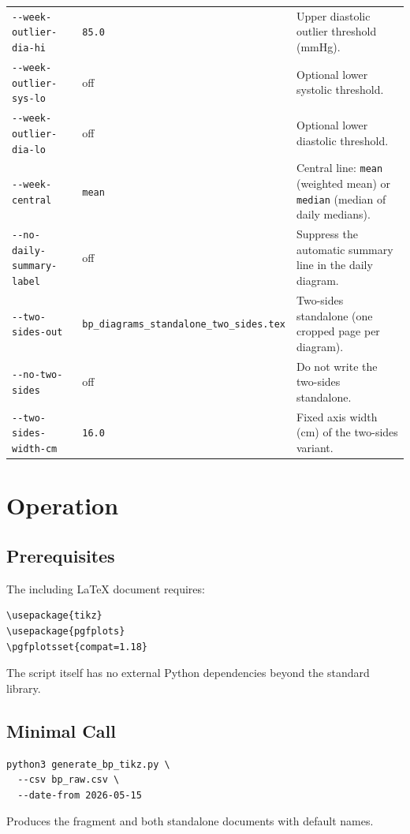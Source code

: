 \documentclass[conference]{IEEEtran}
\newcommand{\param}[1]{\texttt{#1}}
\begin{document}
\begin{table}[!t]
\begin{tabular}{>{\raggedright\arraybackslash}p{} >{\raggedright\arraybackslash}p{} >{\raggedright\arraybackslash}p{}}
\param{-{}-week-outlier-dia-hi} & \texttt{85.0} & Upper diastolic outlier threshold (mmHg). \\
\param{-{}-week-outlier-sys-lo} & off & Optional lower systolic threshold. \\
\param{-{}-week-outlier-dia-lo} & off & Optional lower diastolic threshold. \\
\param{-{}-week-central} & \texttt{mean} & Central line: \texttt{mean} (weighted mean) or \texttt{median} (median of daily medians). \\
\param{-{}-no-daily-summary-label} & off & Suppress the automatic summary line in the daily diagram. \\
\param{-{}-two-sides-out} & \texttt{bp\_\hspace{0pt}diagrams\_\hspace{0pt}standalone\_\hspace{0pt}two\_\hspace{0pt}sides.tex} & Two-sides standalone (one cropped page per diagram). \\
\param{-{}-no-two-sides} & off & Do not write the two-sides standalone. \\
\param{-{}-two-sides-width-cm} & \texttt{16.0} & Fixed axis width (cm) of the two-sides variant. \\
\bottomrule
\end{tabular}
\end{table}

\section{Operation}
\subsection{Prerequisites}
The including LaTeX document requires:
\begin{lstlisting}[style=sh]
\usepackage{tikz}
\usepackage{pgfplots}
\pgfplotsset{compat=1.18}
\end{lstlisting}
The script itself has no external Python dependencies beyond the standard
library.

\subsection{Minimal Call}
\begin{lstlisting}[style=sh]
python3 generate_bp_tikz.py \
  --csv bp_raw.csv \
  --date-from 2026-05-15
\end{lstlisting}
Produces the fragment and both standalone documents with default names.
\end{document}
